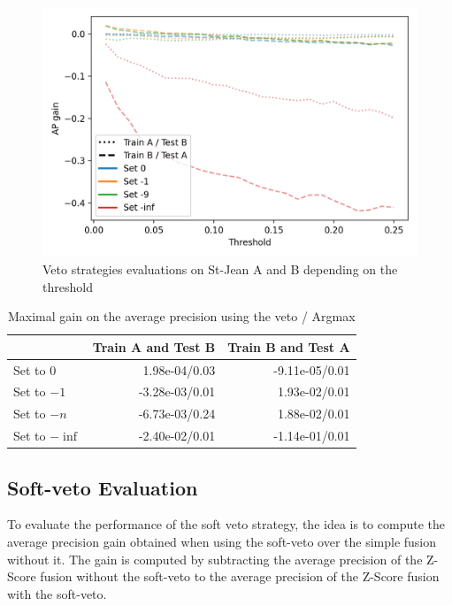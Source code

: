 \begin{figure}
  \caption{Veto strategies evaluations on St-Jean A and B depending on the threshold}
  \label{fig:veto}
  \includegraphics[width=\linewidth]{img/veto.png}
\end{figure}

\begin{table}
  \centering
  \caption{Maximal gain on the average precision using the veto / Argmax}
  \label{tab:veto}
  \begin{tabular}{l r r}
    \toprule
                   & Train A and Test B & Train B and Test A \\
    \midrule
    Set to $0$     & 1.98e-04/0.03 & -9.11e-05/0.01 \\
    Set to $-1$    & -3.28e-03/0.01 & 1.93e-02/0.01 \\
    Set to $-n$    & -6.73e-03/0.24 & 1.88e-02/0.01 \\
    Set to $-\inf$ & -2.40e-02/0.01 & -1.14e-01/0.01 \\
    \bottomrule
  \end{tabular}
\end{table}

\subsection{Soft-veto Evaluation}

To evaluate the performance of the soft veto strategy, the idea is to compute the average precision gain obtained when using the soft-veto over the simple fusion without it.
The gain is computed by subtracting the average precision of the Z-Score fusion without the soft-veto to the average precision of the Z-Score fusion with the soft-veto.


